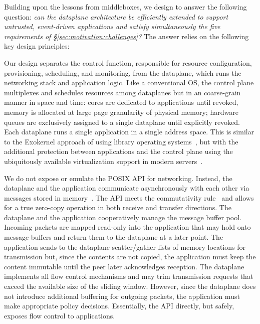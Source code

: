 
Building upon the lessons from middleboxes, we design \ix to answer
the following question: {\it can the dataplane architecture be
  efficiently extended to support untrusted, event-driven applications
  and satisfy simultaneously the five requirements of
  \S\ref{sec:motivation:challenges}?}  The answer relies on the
following key design principles:


Our design separates the control function, responsible for resource
configuration, provisioning, scheduling, and monitoring, from the
dataplane, which runs the networking stack and application logic.
Like a conventional OS, the control plane multiplexes and schedules
resources among dataplanes but in an coarse-grain manner in space and
time: cores are dedicated to applications until revoked, memory is
allocated at large page granularity of physical memory; hardware queues are
exclusively assigned to a single dataplane until explicitly revoked.
Each dataplane runs a single application in a single address space.
This is similar to the Exokernel approach of using library operating
systems~\cite{DBLP:conf/sosp/EnglerKO95}, but with the additional
protection between applications and the control plane using the
ubiquitously available virtualization support in modern
servers~\cite{DBLP:journals/computer/UhligNRSMABKLS05,belay2012dune}.

 We do
not expose or emulate the POSIX API for networking.  Instead, the
dataplane and the application communicate asynchronously with each
other via messages stored in
memory~\cite{rizzo2012netmap,han2012megapipe}.  The API meets the
commutativity rule~\cite{DBLP:conf/sosp/ClementsKZMK13} and allows for
a true zero-copy operation in both receive and transfer
directions. The dataplane and the application cooperatively manage the
message buffer pool. Incoming packets are mapped read-only into the
application that may hold onto message buffers and return them to the
dataplane at a later point.  The application sends to the dataplane
scatter/gather lists of memory locations for transmission but, since
the contents are not copied, the application must keep the content
immutable until the peer later acknowledges reception. The dataplane
implements all flow control mechanisms and may trim transmission
requests that exceed the available size of the sliding
window. However, since the dataplane does not introduce additional
buffering for outgoing packets, the application must make appropriate
policy decisions. Essentially, the API directly, but safely, exposes
flow control to applications.


